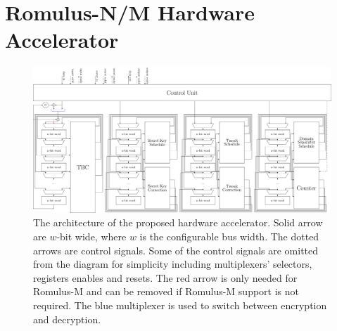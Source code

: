 \documentclass[conference]{IEEEtran}
\begin{document}
\section{Romulus-N/M Hardware Accelerator}

\begin{figure}[!htb]
  \centering
  \includegraphics[width=\textwidth]{arch_diagram.pdf}
  \caption{The architecture of the proposed hardware accelerator. Solid arrow are $w$-bit wide, where $w$ is the configurable bus width. The dotted arrows are control signals. Some of the control signals are omitted from the diagram for simplicity including multiplexers' selectors, registers enables and resets. The red arrow is only needed for Romulus-M and can be removed if Romulus-M support is not required. The blue multiplexer is used to switch between encryption and decryption.}\label{fig:arch}
\end{figure}
\end{document}
